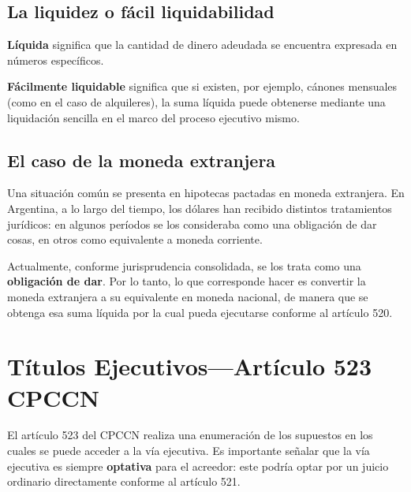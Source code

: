 \documentclass[12pt,oneside]{book}
\begin{document}
\subsection{La liquidez o fácil liquidabilidad}

\textbf{Líquida} significa que la cantidad de dinero adeudada se encuentra expresada en números específicos.

\textbf{Fácilmente liquidable} significa que si existen, por ejemplo, cánones mensuales (como en el caso de alquileres), la suma líquida puede obtenerse mediante una liquidación sencilla en el marco del proceso ejecutivo mismo.

\subsection{El caso de la moneda extranjera}

Una situación común se presenta en hipotecas pactadas en moneda extranjera. En Argentina, a lo largo del tiempo, los dólares han recibido distintos tratamientos jurídicos: en algunos períodos se los consideraba como una obligación de dar cosas, en otros como equivalente a moneda corriente.

Actualmente, conforme jurisprudencia consolidada, se los trata como una \textbf{obligación de dar}. Por lo tanto, lo que corresponde hacer es convertir la moneda extranjera a su equivalente en moneda nacional, de manera que se obtenga esa suma líquida por la cual pueda ejecutarse conforme al artículo 520.

\section{Títulos Ejecutivos---Artículo 523 CPCCN}

El artículo 523 del CPCCN realiza una enumeración de los supuestos en los cuales se puede acceder a la vía ejecutiva. Es importante señalar que la vía ejecutiva es siempre \textbf{optativa} para el acreedor: este podría optar por un juicio ordinario directamente conforme al artículo 521.
\end{document}
